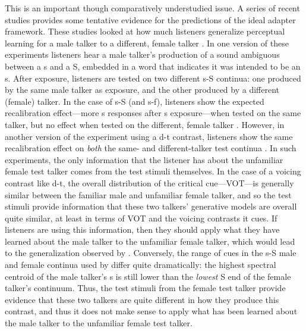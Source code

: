 This is an important though comparatively understudied issue.  A series of recent studies provides some tentative evidence for the predictions of the ideal adapter framework.  These studies looked at how much listeners generalize perceptual learning for a male talker to a different, female talker \autocite[or vice versa;][]{Eisner2005,Kraljic2005,Kraljic2006,Kraljic2007}.  In one version of these experiments listeners hear a male talker's production of a sound ambiguous between a \ph s and a \ph S, embedded in a word that indicates it was intended to be an \ph s.  After exposure, listeners are tested on two different \ph s-\ph S continua: one produced by the same male talker as exposure, and the other produced by a different (female) talker.  In the case of \ph s-\ph S (and \ph s-\ph f), listeners show the expected recalibration effect---more \ph s responses after \ph s exposure---when tested on the same talker, but no effect when tested on the different, female talker \autocite{Eisner2005,Kraljic2005}.  However, in another version of the experiment using a \ph d-\ph t contrast, listeners show the same recalibration effect on \emph{both} the same- and different-talker test continua \autocite{Kraljic2006}.  In such experiments, the only information that the listener has about the unfamiliar female test talker comes from the test stimuli themselves.  In the case of a voicing contrast like \ph d-\ph t, the overall distribution of the critical cue---VOT---is generally similar between the familiar male and unfamiliar female talker, and so the test stimuli provide information that these two talkers' generative models are overall quite similar, at least in terms of VOT and the voicing contrasts it cues.  If listeners are using this information, then they should apply what they have learned about the male talker to the unfamiliar female talker, which would lead to the generalization observed by \textcite{Kraljic2006}.  Conversely, the range of cues in the \ph s-\ph S male and female continua used by \textcite{Kraljic2005} differ quite dramatically: the highest spectral centroid of the male talker's \ph s is still lower than the \emph{lowest} \ph S end of the female talker's continuum.  Thus, the test stimuli from the female test talker provide evidence that these two talkers are quite different in how they produce this contrast, and thus it does not make sense to apply what has been learned about the male talker to the unfamiliar female test talker.  


